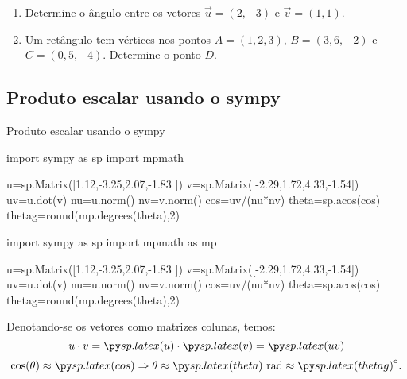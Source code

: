 \begin{frame}[label=vetores2]
\begin{casa}
\begin{enumerate}
\item Determine o ângulo entre os vetores $\vec{u}=(2,-3)$ e $\vec{v}=(1,1)$.
\item Um retângulo tem vértices nos pontos $A=(1,2,3)$, $B=(3,6,-2)$ e $C=(0,5,-4)$. Determine o ponto $D$.
\end{enumerate}
\end{casa}
\end{frame}


\subsection*{Produto escalar usando o sympy}
\begin{frame}[label=vetores2,fragile=singleslide]{Produto escalar usando o sympy}

	\begin{footnotesize}
\begin{pyverbatim}
import sympy as sp
import mpmath

u=sp.Matrix([1.12,-3.25,2.07,-1.83 ])
v=sp.Matrix([-2.29,1.72,4.33,-1.54])
uv=u.dot(v)
nu=u.norm()
nv=v.norm()
cos=uv/(nu*nv)
theta=sp.acos(cos)
thetag=round(mp.degrees(theta),2)
\end{pyverbatim}
	\end{footnotesize}	

\begin{pycode}
import sympy as sp
import mpmath as mp

u=sp.Matrix([1.12,-3.25,2.07,-1.83 ])
v=sp.Matrix([-2.29,1.72,4.33,-1.54])
uv=u.dot(v)
nu=u.norm()
nv=v.norm()
cos=uv/(nu*nv)
theta=sp.acos(cos)
thetag=round(mp.degrees(theta),2)
\end{pycode}
Denotando-se os vetores como matrizes colunas, temos:
\[u\cdot v=\pyl{u}\cdot \pyl{v}=\pyl{uv}\]
\[\cos(\theta)\approx\pyl{cos}\Rightarrow \theta\approx\pyl{theta} \text{ rad}\approx \pyl{thetag}^\circ.\]
\end{frame}




